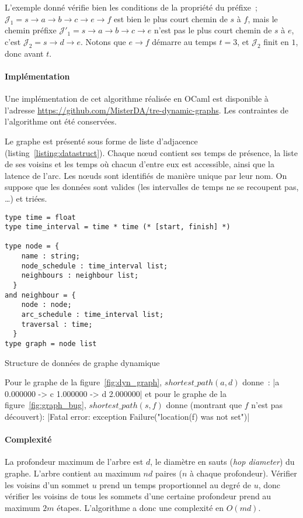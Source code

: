 \documentclass[12pt,a4paper]{article}
\begin{document}
L'exemple donné vérifie bien les conditions de la propriété du
préfixe~;
\(\mathcal{J}_1 = s \rightarrow a \rightarrow b \rightarrow c
\rightarrow e \rightarrow f\) est bien le plus court chemin de \(s\) à
\(f\), mais le chemin préfixe
\(\mathcal{J}'_1 = s \rightarrow a \rightarrow b \rightarrow c
\rightarrow e\) n'est pas le plus court chemin de \(s\) à \(e\), c'est
\(\mathcal{J}_2 = s \rightarrow d \rightarrow e\). Notons que
\(e \rightarrow f\) démarre au temps \(t = 3\), et \(\mathcal{J}_2\)
finit en \(1\), donc avant \(t\).

\paragraph{Implémentation}
Une implémentation de cet algorithme réalisée en OCaml est disponible
à l'adresse \url{https://github.com/MisterDA/tre-dynamic-graphs}. Les
contraintes de l'algorithme ont été conservées.

Le graphe est présenté sous forme de liste d'adjacence
(listing~\ref{listing:datastruct}). Chaque nœud contient ses temps de
présence, la liste de ses voisins et les temps où chacun d'entre eux
est accessible, ainsi que la latence de l'arc. Les nœuds sont
identifiés de manière unique par leur nom. On suppose que les données
sont valides (les intervalles de temps ne se recoupent pas, …)  et
triées.\\

\begin{listing}[h]
  \begin{verbatim}
type time = float
type time_interval = time * time (* [start, finish] *)

type node = {
    name : string;
    node_schedule : time_interval list;
    neighbours : neighbour list;
  }
and neighbour = {
    node : node;
    arc_schedule : time_interval list;
    traversal : time;
  }
type graph = node list
  \end{verbatim}
  \caption{Structure de données de graphe
    dynamique}\label{listing:datastruct}
\end{listing}

Pour le graphe de la figure~\ref{fig:dyn_graph},
\(shortest\_path(a, d)\) donne~:
|a 0.000000 -> c 1.000000 -> d 2.000000|
et pour le graphe de la figure~\ref{fig:graph_bug},
\(shortest\_path(s, f)\) donne (montrant que \(f\) n'est pas
découvert):
|Fatal error: exception Failure("location(f) was not set")|

\paragraph{Complexité} La profondeur maximum de l'arbre est \(d\), le
diamètre en sauts (\textit{hop diameter}) du graphe. L'arbre contient
au maximum \(n d\) paires (\(n\) à chaque profondeur). Vérifier les
voisins d'un sommet \(u\) prend un temps proportionnel au degré de
\(u\), donc vérifier les voisins de tous les sommets d'une certaine
profondeur prend au maximum \(2m\) étapes. L'algorithme a donc une
complexité en \(O(m d)\).
\end{document}

